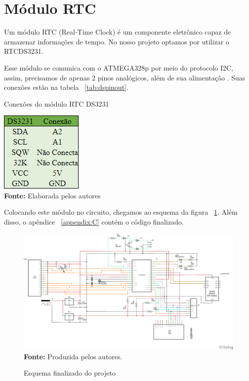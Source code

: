 \section{Módulo RTC}
Um módulo RTC (Real-Time Clock) é um componente eletrônico
capaz de armazenar informações de tempo. No nosso projeto
optamos por utilizar o RTCDS3231.

Esse módulo se comunica com o ATMEGA328p por meio do protocolo I2C,
assim, precisamos de apenas 2 pinos analógicos, além de sua alimentação
\cite{mallari2020}. Suas conexões estão na tabela ~\ref{tab:dspinout}.

\FloatBarrier
\begin{table}[!htbp]
	\centering
	\caption{Conexões do módulo RTC DS3231}
	\includegraphics[scale=1]{imagens/dspinout}
	\\ \vspace{0.2cm}
	\textbf{Fonte:} Elaborada pelos autores
	\label{tab:dspinout}
\end{table}
\FloatBarrier

Colocando este módulo no circuito, chegamos ao esquema
da figura ~\ref{fig:final}. Além disso, o apêndice
~\ref{appendix:C} contém o código finalizado.

\FloatBarrier
\begin{figure}[!htbp]
	\centering
	\caption{Esquema finalizado do projeto}
	\includegraphics[scale=.7]{imagens/esquemalog}
	\\\textbf{Fonte:} Produzida pelos autores.
	\label{fig:final}
\end{figure}
\FloatBarrier